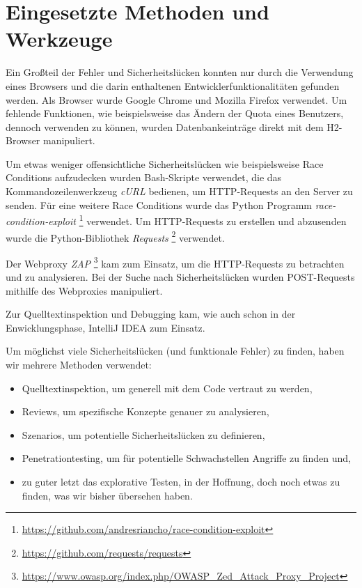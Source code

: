 \documentclass[12pt,DIV14,BCOR10mm,a4paper,parskip=half-,headsepline,headinclude,english,ngerman,bibliography=totocnumbered]{scrreprt}
\begin{document}
\chapter{Eingesetzte Methoden und Werkzeuge}

Ein Großteil der Fehler und Sicherheitslücken konnten nur durch die Verwendung eines Browsers und die darin enthaltenen Entwicklerfunktionalitäten gefunden werden. Als Browser wurde Google Chrome und Mozilla Firefox verwendet. Um fehlende Funktionen, wie beispielsweise das Ändern der Quota eines Benutzers, dennoch verwenden zu können, wurden Datenbankeinträge direkt mit dem H2-Browser manipuliert.

Um etwas weniger offensichtliche Sicherheitslücken wie beispielsweise Race Conditions aufzudecken wurden Bash-Skripte verwendet, die das Kommandozeilenwerkzeug \textit{cURL} bedienen, um HTTP-Requests an den Server zu senden. Für eine weitere Race Conditions wurde das Python Programm \textit{race-condition-exploit} \footnote{\url{https://github.com/andresriancho/race-condition-exploit}} verwendet. Um HTTP-Requests zu erstellen und abzusenden wurde die Python-Bibliothek \textit{Requests} \footnote{\url{https://github.com/requests/requests}} verwendet.

Der Webproxy \textit{ZAP} \footnote{\url{https://www.owasp.org/index.php/OWASP_Zed_Attack_Proxy_Project}} kam zum Einsatz, um die HTTP-Requests zu betrachten und zu analysieren. Bei der Suche nach Sicherheitslücken wurden POST-Requests mithilfe des Webproxies manipuliert.

Zur Quelltextinspektion und Debugging kam, wie auch schon in der Enwicklungsphase, IntelliJ IDEA zum Einsatz.

Um möglichst viele Sicherheitslücken (und funktionale Fehler) zu finden, haben wir mehrere Methoden verwendet:

\begin{itemize}
  \item Quelltextinspektion, um generell mit dem Code vertraut zu werden,
  \item Reviews, um spezifische Konzepte genauer zu analysieren,
  \item Szenarios, um potentielle Sicherheitslücken zu definieren,
  \item Penetrationtesting, um für potentielle Schwachstellen Angriffe zu finden und,
  \item zu guter letzt das explorative Testen, in der Hoffnung, doch noch etwas zu finden, was wir bisher übersehen haben.
\end{itemize}
\end{document}
